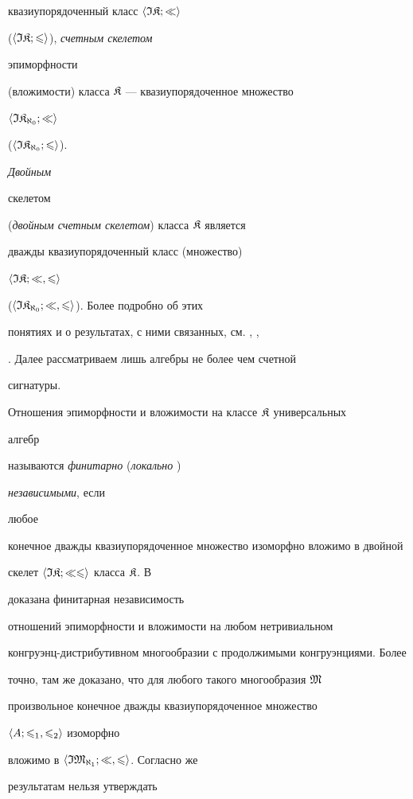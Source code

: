 квазиупорядоченный класс $\langle\frak I\frak K;\ll\rangle$


($\langle\frak I\frak K;\leqslant\rangle$), {\it счетным скелетом}


эпиморфности


(вложимости) класса $\frak K$ --- квазиупорядоченное множество


$\langle\frak I\frak K_{\aleph_0};\ll\rangle$


($\langle\frak I\frak K_{\aleph_0};\leqslant\rangle$). {\it Двойным


скелетом} ({\it двойным счетным скелетом}) класса $\frak K$ является


дважды квазиупорядоченный класс (множество)


$\langle\frak I\frak K;\ll,\leqslant\rangle$


($\langle\frak I\frak K_{\aleph_0};\ll,\leqslant\rangle$). Более подробно об этих


понятиях и о результатах, с ними связанных, см. \cite{P2}, \cite{P3},


\cite{P4}. Далее рассматриваем лишь алгебры не более чем счетной


сигнатуры.





Отношения эпиморфности и вложимости на классе $\frak K$ универсальных


алгебр


называются {\it финитарно} ({\it локально} \cite{P1})


{\it независимыми}, если


любое


конечное дважды квазиупорядоченное множество изоморфно вложимо в двойной


скелет $\langle\frak I\frak K;\ll\leqslant\rangle$ класса $\frak K$. В \cite{P1}


доказана финитарная независимость


отношений эпиморфности и вложимости на любом нетривиальном


конгруэнц-дистрибутивном многообразии с продолжимыми конгруэнциями. Более


точно, там же доказано, что для любого такого многообразия $\frak M$


произвольное конечное дважды квазиупорядоченное множество


$\langle A;\leqslant_1,\leqslant_2\rangle$ изоморфно


вложимо в $\langle\frak I\frak M_{\aleph_1};\ll,\leqslant\rangle$. Согласно же


результатам \cite{P5} нельзя утверждать


